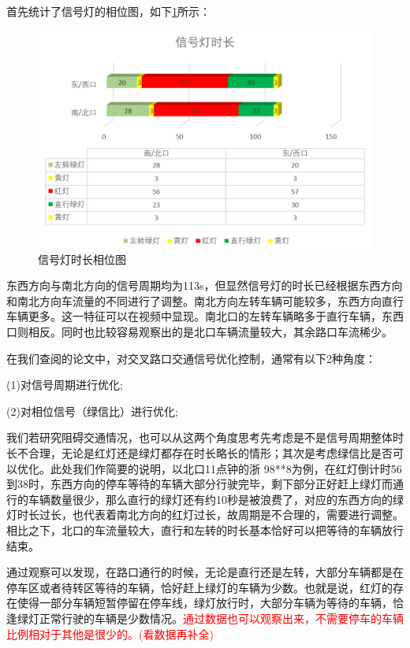 首先统计了信号灯的相位图，如下\ref{fig:p10}所示：
\begin{figure}[H]
    \centering
    \includegraphics[scale=0.5]{figures/信号灯时长相位图.png}
    \caption{信号灯时长相位图}
    \label{fig:p10}
\end{figure}

东西方向与南北方向的信号周期均为113s，但显然信号灯的时长已经根据东西方向和南北方向车流量的不同进行了调整。南北方向左转车辆可能较多，东西方向直行车辆更多。这一特征可以在视频中显现。南北口的左转车辆略多于直行车辆，东西口则相反。同时也比较容易观察出的是北口车辆流量较大，其余路口车流稀少。

在我们查阅的论文中，对交叉路口交通信号优化控制，通常有以下2种角度：

(1)对信号周期进行优化;

(2)对相位信号（绿信比）进行优化;

我们若研究阻碍交通情况，也可以从这两个角度思考先考虑是不是信号周期整体时长不合理，无论是红灯还是绿灯都存在时长略长的情形；其次是考虑绿信比是否可以优化。此处我们作简要的说明，以北口11点钟的浙 98**8为例，在红灯倒计时56到38时，东西方向的停车等待的车辆大部分行驶完毕，剩下部分正好赶上绿灯而通行的车辆数量很少，那么直行的绿灯还有约10秒是被浪费了，对应的东西方向的绿灯时长过长，也代表着南北方向的红灯过长，故周期是不合理的，需要进行调整。相比之下，北口的车流量较大，直行和左转的时长基本恰好可以把等待的车辆放行结束。

通过观察可以发现，在路口通行的时候，无论是直行还是左转，大部分车辆都是在停车区或者待转区等待的车辆，恰好赶上绿灯的车辆为少数。也就是说，红灯的存在使得一部分车辆短暂停留在停车线，绿灯放行时，大部分车辆为等待的车辆，恰逢绿灯正常行驶的车辆是少数情况。\textcolor{red}{通过数据也可以观察出来，不需要停车的车辆比例相对于其他是很少的。(看数据再补全)}

